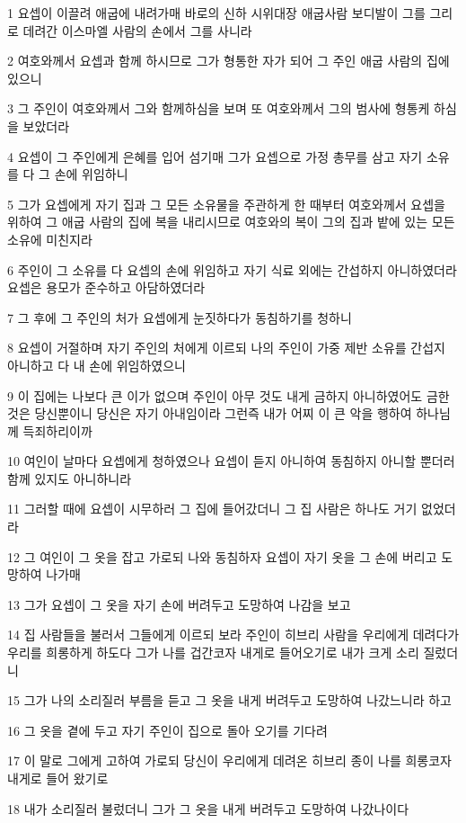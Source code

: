 \par 1 요셉이 이끌려 애굽에 내려가매 바로의 신하 시위대장 애굽사람 보디발이 그를 그리로 데려간 이스마엘 사람의 손에서 그를 사니라
\par 2 여호와께서 요셉과 함께 하시므로 그가 형통한 자가 되어 그 주인 애굽 사람의 집에 있으니
\par 3 그 주인이 여호와께서 그와 함께하심을 보며 또 여호와께서 그의 범사에 형통케 하심을 보았더라
\par 4 요셉이 그 주인에게 은혜를 입어 섬기매 그가 요셉으로 가정 총무를 삼고 자기 소유를 다 그 손에 위임하니
\par 5 그가 요셉에게 자기 집과 그 모든 소유물을 주관하게 한 때부터 여호와께서 요셉을 위하여 그 애굽 사람의 집에 복을 내리시므로 여호와의 복이 그의 집과 밭에 있는 모든 소유에 미친지라
\par 6 주인이 그 소유를 다 요셉의 손에 위임하고 자기 식료 외에는 간섭하지 아니하였더라 요셉은 용모가 준수하고 아담하였더라
\par 7 그 후에 그 주인의 처가 요셉에게 눈짓하다가 동침하기를 청하니
\par 8 요셉이 거절하며 자기 주인의 처에게 이르되 나의 주인이 가중 제반 소유를 간섭지 아니하고 다 내 손에 위임하였으니
\par 9 이 집에는 나보다 큰 이가 없으며 주인이 아무 것도 내게 금하지 아니하였어도 금한 것은 당신뿐이니 당신은 자기 아내임이라 그런즉 내가 어찌 이 큰 악을 행하여 하나님께 득죄하리이까
\par 10 여인이 날마다 요셉에게 청하였으나 요셉이 듣지 아니하여 동침하지 아니할 뿐더러 함께 있지도 아니하니라
\par 11 그러할 때에 요셉이 시무하러 그 집에 들어갔더니 그 집 사람은 하나도 거기 없었더라
\par 12 그 여인이 그 옷을 잡고 가로되 나와 동침하자 요셉이 자기 옷을 그 손에 버리고 도망하여 나가매
\par 13 그가 요셉이 그 옷을 자기 손에 버려두고 도망하여 나감을 보고
\par 14 집 사람들을 불러서 그들에게 이르되 보라 주인이 히브리 사람을 우리에게 데려다가 우리를 희롱하게 하도다 그가 나를 겁간코자 내게로 들어오기로 내가 크게 소리 질렀더니
\par 15 그가 나의 소리질러 부름을 듣고 그 옷을 내게 버려두고 도망하여 나갔느니라 하고
\par 16 그 옷을 곁에 두고 자기 주인이 집으로 돌아 오기를 기다려
\par 17 이 말로 그에게 고하여 가로되 당신이 우리에게 데려온 히브리 종이 나를 희롱코자 내게로 들어 왔기로
\par 18 내가 소리질러 불렀더니 그가 그 옷을 내게 버려두고 도망하여 나갔나이다
